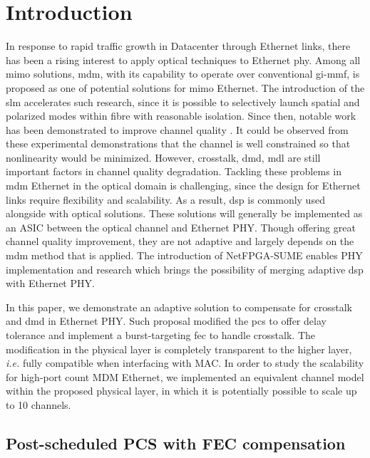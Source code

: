 

\chapter{Introduction}

In response to rapid traffic growth in Datacenter through Ethernet links, there has been a rising interest to apply optical  techniques to Ethernet \ac{phy}. Among all \ac{mimo} solutions, \ac{mdm}, with its capability to operate over conventional \ac{gi-mmf}, is proposed as one of potential solutions for \ac{mimo} Ethernet. The introduction of the \ac{slm} accelerates such research, since it is possible to selectively launch spatial and polarized modes within fibre with reasonable isolation\cite{6227317}. Since then, notable work has been demonstrated to improve channel quality \cite{6706113,shi2015sparse}. It could be observed from these experimental demonstrations that the channel is well constrained so that nonlinearity would be minimized. However, crosstalk, \ac{dmd}, \ac{mdl} are still important factors in channel quality degradation. Tackling these problems in \ac{mdm} Ethernet in the optical domain is challenging, since the design for Ethernet links require flexibility and scalability. As a result, \ac{dsp} is commonly used alongside with optical solutions. These solutions will generally be implemented as an ASIC between the optical channel and Ethernet PHY. Though offering great channel quality improvement, they are not adaptive and largely depends on the \ac{mdm} method that is applied. The introduction of NetFPGA-SUME\cite{6866035} enables PHY implementation and research which brings the possibility of merging adaptive \ac{dsp} with Ethernet PHY.


In this paper, we demonstrate an adaptive solution to compensate for crosstalk and \ac{dmd} in Ethernet PHY. Such proposal modified the \ac{pcs} to offer delay tolerance and implement a burst-targeting \ac{fec} to handle crosstalk. The modification in the physical layer is completely transparent to the higher layer, \textit{i.e.} fully compatible when interfacing with MAC. In order to study the scalability for high-port count MDM Ethernet, we implemented an equivalent channel model within the proposed physical layer, in which it is potentially possible to scale up to 10 channels.



\section{Post-scheduled PCS with FEC compensation}

